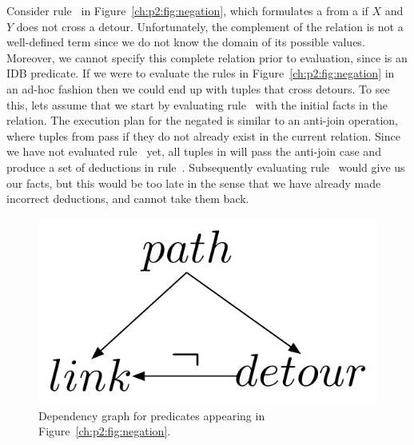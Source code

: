 Consider rule~ in Figure~\ref{ch:p2:fig:negation}, which formulates a
 from a  if $X$ and $Y$ does not cross a detour.
Unfortunately, the complement of the  relation is not a well-defined
term since we do not know the domain of its possible values.  Moreover, we
cannot specify this complete relation prior to evaluation, since  is
an IDB predicate.  If we were to evaluate the rules in
Figure~\ref{ch:p2:fig:negation} in an ad-hoc fashion then we could end up with
 tuples that cross detours.  To see this, lets assume that we start by
evaluating rule~ with the initial facts in the  relation.  The
execution plan for the negated  is similar to an anti-join
operation, where tuples from  pass if they do not already exist in the
current  relation.  Since we have not evaluated rule~ yet,
all tuples in  will pass the anti-join case and produce a set of
 deductions in rule~.  Subsequently evaluating rule~
would give us our  facts, but this would be too late in the sense
that we have already made incorrect deductions, and cannot take them back.

\begin{figure} 
\ssp
\begin{center}
\includegraphics[scale=1]{figures/dependency-graph}
\caption{\label{ch:p2:fig:dependency}Dependency graph for predicates 
appearing in Figure~\ref{ch:p2:fig:negation}.}
\end{center} 
\end{figure}

